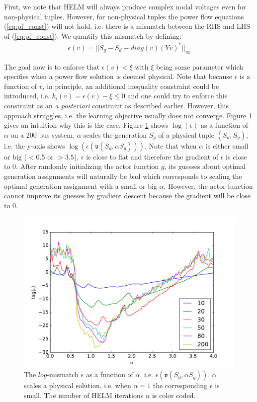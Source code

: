 First, we note that HELM will always produce complex nodal voltages even for non-physical tuples. However, for non-physical tuples the power flow equations (\ref{eq:pf_const}) will not hold, i.e. there is a mismatch between the RHS and LHS of (\ref{eq:pf_const}). We quantify this mismatch by defining: 
\begin{align*}
\epsilon(v) = ||S_{g} - S_{d} - diag(v)(Yv)^*||_\infty
\end{align*} 

The goal now is to enforce that $\epsilon(v) < \xi$ with $\xi$ being some parameter which specifies when a power flow solution is deemed physical. Note that because $\epsilon$ is a function of $v$, in principle, an additional inequality constraint could be introduced, i.e. $k_i(v) = \epsilon(v) - \xi \leq 0$ and one could try to enforce this constraint as an \emph{a posteriori} constraint as described earlier. However, this approach struggles, i.e. the learning objective usually does not converge. Figure \ref{fig:errors} gives an intuition why this is the case. Figure \ref{fig:errors} shows $\log(\epsilon)$ as a function of $\alpha$ on a 200 bus system. $\alpha$ scales the generation $S_g$ of a physical tuple $(S_d,S_g)$, i.e. the y-axis shows $\log(\epsilon(\mathfrak{v}(S_d,\alpha S_g)))$. Note that when $\alpha$ is either small or big ($<0.5$ or $>3.5$), $\epsilon$ is close to flat and therefore the gradient of $\epsilon$ is close to 0. After randomly initializing the actor function $g$, its guesses about optimal generation assignments will naturally be bad which corresponds to scaling the optimal generation assignment with a small or big $\alpha$. However, the actor function cannot improve its guesses by gradient descent because the gradient will be close to 0.

\begin{figure}
\includegraphics[width=\linewidth]{krtofl/error_phys.pdf}
\caption[LOPF: The $log$-mismatch $\epsilon$ as a function of $\alpha$]{The $log$-mismatch $\epsilon$ as a function of $\alpha$, i.e. $\epsilon(\mathfrak{v}(S_d,\alpha S_g))$. $\alpha$ scales a physical solution, i.e. when $\alpha = 1$ the corresponding $\epsilon$ is small. The number of HELM iterations $n$ is color coded.}
\label{fig:errors}
\end{figure}

